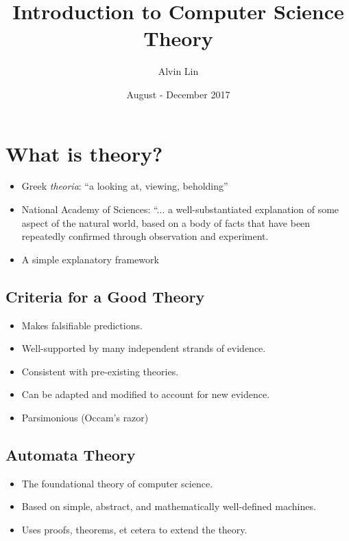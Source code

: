 \documentclass[letterpaper, 12pt]{math}
\title{Introduction to Computer Science Theory}
\author{Alvin Lin}
\date{August - December 2017}
\begin{document}
\maketitle

\section*{What is theory?}
\begin{itemize}
  \item Greek \textit{theoria}: ``a looking at, viewing, beholding''
  \item National Academy of Sciences: ``... a well-substantiated
    explanation of some aspect of the natural world, based on a body of
    facts that have been repeatedly confirmed through observation and
    experiment.
  \item A simple explanatory framework
\end{itemize}

\subsection*{Criteria for a Good Theory}
\begin{itemize}
  \item Makes falsifiable predictions.
  \item Well-supported by many independent strands of evidence.
  \item Consistent with pre-existing theories.
  \item Can be adapted and modified to account for new evidence.
  \item Parsimonious (Occam's razor)
\end{itemize}

\subsection*{Automata Theory}
\begin{itemize}
  \item The foundational theory of computer science.
  \item Based on simple, abstract, and mathematically well-defined
    machines.
  \item Uses proofs, theorems, et cetera to extend the theory.
\end{itemize}
\end{document}
